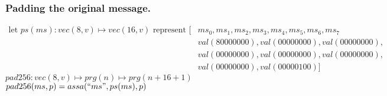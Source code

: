 \documentclass[11pt]{article}
\begin{document}
  \subsubsection{Padding the original message.}
  \begin{align*}
  \text{let $ps(ms) : vec(8,v) \mapsto vec(16,v)$ represent } 
          [&ms_0,ms_1, ms_2, ms_3, ms_4, ms_5, ms_6, ms_7 \\
           &val(80000000),val(00000000),val(00000000), \\
           &val(00000000),val(00000000),val(00000000), \\
           &val(00000000),val(00000100)]
  \end{align*}
  $pad256 : vec(8,v) \mapsto prg(n) \mapsto prg(n + 16 + 1)$ \\
  $pad256(ms,p) = assa(``ms",ps(ms),p)$
 
\end{document}
